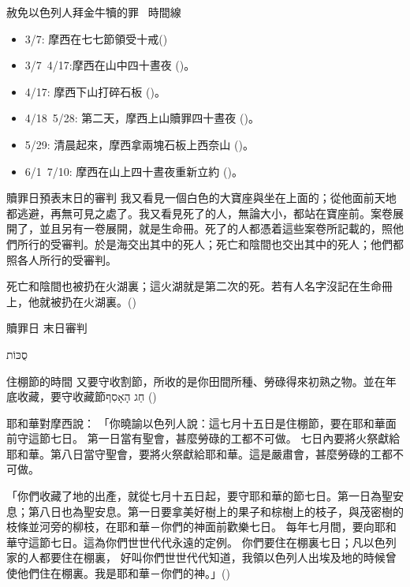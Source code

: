 \documentclass{beamer}
\newcommand{\topic}[1]{
\begin{frame}
    \centering
    \vspace*{1cm}
    {\fontsize{40}{48}\selectfont #1\par}
    \vfill
\end{frame}
}
\newcommand{\conclusion}[2]{
\begin{frame}
    \centering
    \vspace*{1cm}
    {\fontsize{40}{48}\selectfont #1 \textemdash #2\par}
    \vfill
\end{frame}
}
\newcommand{\parvspace}{\par\vspace{0.5em}}
\begin{document}
\begin{frame}{赦免以色列人拜金牛犢的罪 \textendash\ 時間線}
	\begin{itemize}
		\item 3/7: 摩西在七七節領受十戒()\parencite{TenCommandmentsOnShavuot}
		\item 3/7\textendash\ 4/17:摩西在山中\alert{四十晝夜} ()。
		\item 4/17: 摩西下山打碎石板 ()。
		\item 4/18\textendash\ 5/28: 第二天，摩西上山贖罪\alert{四十晝夜} ()。
		\item 5/29: 清晨起來，摩西拿兩塊石板上西奈山 ()。
		\item 6/1\textendash\ \alert{7/10}: 摩西在山上\alert{四十晝夜}重新立約 ()。
	\end{itemize}
\end{frame}

\begin{frame}{贖罪日預表末日的審判}
	我又看見一個白色的大寶座與坐在上面的；從他面前天地都逃避，再無可見之處了。我又看見死了的人，無論大小，都站在寶座前。案卷展開了，並且另有一卷展開，就是生命冊。\alert{死了的人都憑着這些案卷所記載的，照他們所行的受審判}。於是海交出其中的死人；死亡和陰間也交出其中的死人；他們都照各人所行的受審判。\parvspace
	死亡和陰間也被扔在火湖裏；這火湖就是第二次的死。\alert{若有人名字沒記在生命冊上，他就被扔在火湖裏}。()\parvspace
\end{frame}

\conclusion{贖罪日}{末日審判}

\topic{\texthebrew{סֻכּוֹת}}

\begin{frame}{住棚節的時間}
	又要守收割節，所收的是你田間所種、勞碌得來初熟之物。並在年底收藏，要守\alert{收藏節\texthebrew{חַג הָאָסִף}} ()\parvspace
	耶和華對摩西說： 「你曉諭以色列人說：這\alert{七月十五日是住棚節，要在耶和華面前守這節七日}。 第一日當有聖會，甚麼勞碌的工都不可做。 七日內要將火祭獻給耶和華。\alert{第八日當守聖會}，要將火祭獻給耶和華。這是嚴肅會，甚麼勞碌的工都不可做。\parvspace
	\textellipsis{}\parvspace
	「你們收藏了地的出產，就\alert{從七月十五日起，要守耶和華的節七日。第一日為聖安息；第八日也為聖安息}。第一日要拿美好樹上的果子和棕樹上的枝子，與茂密樹的枝條並河旁的柳枝，在耶和華－你們的神面前歡樂七日。 每年七月間，要向耶和華守這節七日。這為你們世世代代永遠的定例。 \alert{你們要住在棚裏七日；凡以色列家的人都要住在棚裏， 好叫你們世世代代知道，我領以色列人出埃及地的時候曾使他們住在棚裏。我是耶和華－你們的神}。」()\parvspace
\end{frame}
\end{document}
